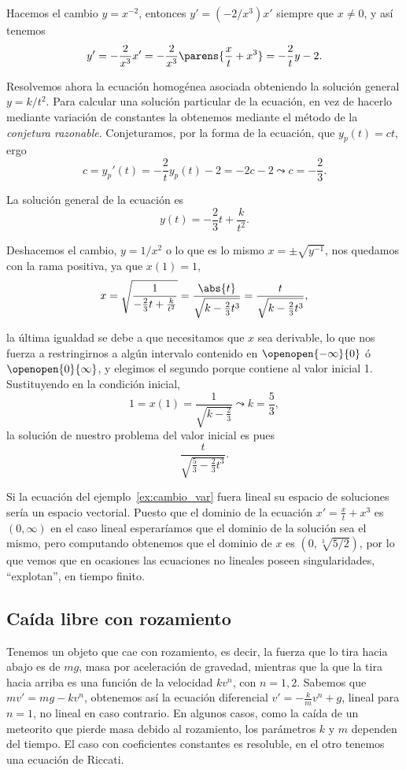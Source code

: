 \documentclass[../ecuaciones_diferenciales.tex]{subfiles}
\begin{document}
\begin{solution}
	Hacemos el cambio \(y = x^{-2}\), entonces \(y' = (-2/x^3) x'\) siempre que
	\(x \neq 0\), y así tenemos
	\[y' = -\frac{2}{x^3} x' = -\frac{2}{x^3}\parens{\frac{x}{t} + x^3} =
		-\frac{2}{t}y - 2.\]

	Resolvemos ahora la ecuación homogénea asociada obteniendo la solución
	general \(y = k/t^2\). Para calcular una solución particular de la
	ecuación, en vez de hacerlo mediante variación de constantes la obtenemos
	mediante el método de la \emph{conjetura razonable}. Conjeturamos, por la
	forma de la ecuación, que \(y_p(t) = ct\), ergo
	\[c = y_p'(t) = -\frac{2}{t} y_p(t) - 2 = -2c -2
		\leadsto c = -\frac{2}{3}.\]

	La solución general de la ecuación es
	\[y(t) = -\frac{2}{3}t + \frac{k}{t^2}.\]

	Deshacemos el cambio, \(y = 1/x^2\) o lo que es lo mismo
	\(x = \pm \sqrt{y^{-1}}\), nos quedamos con la rama positiva, ya que
	\(x(1) = 1\),
	\[x = \sqrt{\frac{1}{-\frac{2}{3}t + \frac{k}{t^2}}} =
		\frac{\abs{t}}{\sqrt{k - \frac{2}{3}t^3}} = \frac{t}{\sqrt{k -
				\frac{2}{3}t^3}},\]

	la última igualdad se debe a que necesitamos que \(x\) sea derivable, lo que
	nos fuerza a restringirnos a algún intervalo contenido en
	\(\openopen{-\infty}{0}\) ó \(\openopen{0}{\infty}\), y elegimos el segundo
	porque contiene al valor inicial 1.  Sustituyendo en la condición inicial,
	\[1 = x(1) = \frac{1}{\sqrt{k - \frac{2}{3}}} \leadsto k = \frac{5}{3},\]
	la solución de nuestro problema del valor inicial es pues
	\[\frac{t}{\sqrt{\frac{5}{3} - \frac{2}{3}t^3}}.\]
\end{solution}

\begin{remark}
	Si la ecuación del ejemplo~\ref{ex:cambio_var} fuera lineal su espacio de
	soluciones sería un espacio vectorial. Puesto que el dominio de la ecuación
	\(x' = \frac{x}{t} + x^3\) es \((0, \infty)\) en el caso lineal esperaríamos
	que el dominio de la solución sea el mismo, pero computando obtenemos que el
	dominio de \(x\) es \((0, \sqrt[3]{5/2})\), por lo que vemos que en ocasiones
	las ecuaciones no lineales poseen singularidades, ``explotan'', en tiempo
	finito.
\end{remark}

\subsection{Caída libre con rozamiento}
Tenemos un objeto que cae con rozamiento, es decir, la fuerza que lo tira
hacia abajo es de \(mg\), masa por aceleración de gravedad, mientras que la
que la tira hacia arriba es una función de la velocidad \(kv^n\), con
\(n = 1,2\). Sabemos que \(mv' = mg - kv^n\), obtenemos así la ecuación
diferencial \(v' = -\frac{k}{m} v^n + g\), lineal para \(n = 1\), no lineal
en caso contrario. En algunos casos, como la caída de un meteorito que
pierde masa debido al rozamiento, los parámetros \(k\) y \(m\) dependen del
tiempo. El caso con coeficientes constantes es resoluble, en el otro tenemos una
ecuación de  Riccati.
\end{document}
